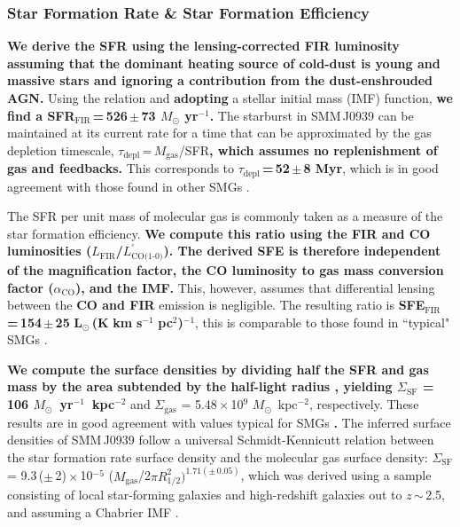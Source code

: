 \documentclass[iop, revtex4]{emulateapj}
\newcommand{\Msun}{\mbox{$M_{\odot}$}}
\newcommand{\Lsun}{\mbox{L$_{\odot}$}}
\newcommand{\Lp}{\mbox{$L^{\prime}_\textrm{CO(1-0)}$}}
\newcommand{\LpU}{\mbox{K\,\,km\,\,s$^{-1}$\,\,pc$^2$}}
\newcommand{\eg}{{\sl e.g.,~}}
\newcommand{\pmOne}{\mbox{$^{-1}$}}
\begin{document}
\subsubsection{{\bf Star Formation Rate \& Star Formation Efficiency}}
{\bf We derive the SFR using the lensing-corrected FIR luminosity assuming 
that the dominant heating source of cold-dust is young and massive stars and ignoring a contribution from the
dust-enshrouded AGN.}
Using the \citet{Kennicutt98a} relation and {\bf adopting} a \citet{Chabrier03a}
stellar initial mass (IMF) function, {\bf we find a
SFR$_\textrm{FIR}$\,=\,526\,$\pm$\,73 $M_
\odot$ yr\pmOne.}
The starburst in SMM\,J0939 can be maintained at its
current rate for a time that can be approximated by the gas depletion timescale, $\tau_\textrm{depl}$\,=\,$M_\textrm{gas}$/SFR{\bf , which assumes no replenishment of gas and feedbacks.}
This corresponds to {\bf $\tau_\textrm{depl}$\,=\,52\,$\pm$\,8 Myr}, which is in good agreement with those found in other SMGs \citep[\eg][]{Greve05a}.

The SFR per unit mass of molecular gas is commonly taken as a
measure of the star formation efficiency. 
{\bf We compute this ratio using the {\bf FIR}
and CO luminosities {\bf ($L_\textrm{FIR}$/\Lp)}. The derived SFE is therefore independent of the magnification factor, the CO luminosity to gas mass conversion factor ($\alpha_\textrm{CO}$), and the
IMF. }This, however, assumes that differential lensing between the {\bf CO and FIR} emission is negligible.
The resulting ratio is {\bf SFE$_\textrm{FIR}$\,=\,154\,$\pm$\,25\,\,\Lsun\,(\LpU)$^{-1}$}, this is comparable
to those found in ``typical" SMGs \citep{Greve05a,Tacconi06a,Riechers11c}.

{\bf We compute the surface densities by dividing half the SFR and gas mass by the area subtended by the half-light
radius \citep[\eg][]{Genzel10a, Harrison15a}, yielding 
$\Sigma_\textrm{SF}$ = 106  \Msun~yr\pmOne~kpc$^{-2}$} and $\Sigma_\textrm{gas}$ = 5.48\,$\times$\,10$^9$ \Msun~kpc$^{-2}$, respectively. 
These results are in good agreement with values typical for SMGs {\bf \citep{Tacconi06a, Hodge15a}. }  %
The inferred surface densities of SMM\,J0939 follow a universal Schmidt-Kennicutt relation between the star formation rate
surface density and the molecular gas surface density: $\Sigma_\textrm{SF}$ = 9.3\,($\pm$\,2)\,$\times$\,10$^{-5}$ ($M_\textrm{gas}$/2$\pi R_\textrm{1/2}^2)^{1.71(\pm\,0.05)}$, which was derived using a sample consisting of local star-forming galaxies and high-redshift
galaxies
out to $z$\,$\sim$\,2.5, and assuming a Chabrier IMF \citep{B07a}.
\end{document}
